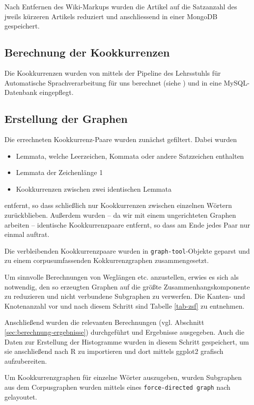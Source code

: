 \documentclass[11pt, a4paper]{article}
\begin{document}
Nach Entfernen des Wiki-Markups wurden die Artikel auf die Satzanzahl
des jweils k\"urzeren Artikels reduziert und anschliessend in einer MongoDB
gespeichert.


\subsection{Berechnung der Kookkurrenzen}

Die Kookkurrenzen wurden von mittels der Pipeline des Lehrsstuhls f\"ur
Automatische Sprachverarbeitung für uns berechnet (siehe \cite{Quasthoff2006})
und in eine MySQL-Datenbank eingepflegt.


\subsection{Erstellung der Graphen}

Die errechneten Kookkurrenz-Paare wurden zunächst gefiltert. Dabei wurden 
\begin{itemize}
    \item Lemmata, welche Leerzeichen, Kommata oder andere Satzzeichen enthalten
    \item Lemmata der Zeichenlänge 1
    \item Kookkurrenzen zwischen zwei identischen Lemmata
\end{itemize}
entfernt, so dass schließlich nur Kookkurrenzen zwischen einzelnen Wörtern
zurückblieben.
Außerdem wurden -- da wir mit einem ungerichteten Graphen arbeiten -- identische
Kookkurrenzpaare entfernt, so dass am Ende jedes Paar nur einmal auftrat.

Die verbleibenden Kookkurrenzpaare wurden in \texttt{graph-tool}-Objekte geparst
und zu einem corpusumfassenden Kokkurrenzgraphen zusammengesetzt.

Um sinnvolle Berechnungen von Weglängen etc. anzustellen, erwies es sich als
notwendig, den so erzeugten Graphen auf die größte Zusammenhangskomponente zu
reduzieren und nicht verbundene Subgraphen zu verwerfen.
Die Kanten- und Knotenanzahl vor und nach diesem Schritt sind Tabelle
\ref{tab-zsf} zu entnehmen.

Anschließend wurden die relevanten Berechnungen (vgl. Abschnitt
\ref{sec:berechnung-ergebnisse}) durchgeführt und Ergebnisse ausgegeben.
Auch die Daten zur Erstellung der Histogramme wurden in diesem Schritt
gespeichert, um sie anschließend nach R zu importieren und dort mittels ggplot2
grafisch aufzubereiten.

Um Kookkurrenzgraphen für einzelne Wörter auszugeben, wurden Subgraphen aus dem
Corpusgraphen wurden mittels eines \texttt{force-directed graph} nach
\cite{Hu2006} gelayoutet.
\end{document}
